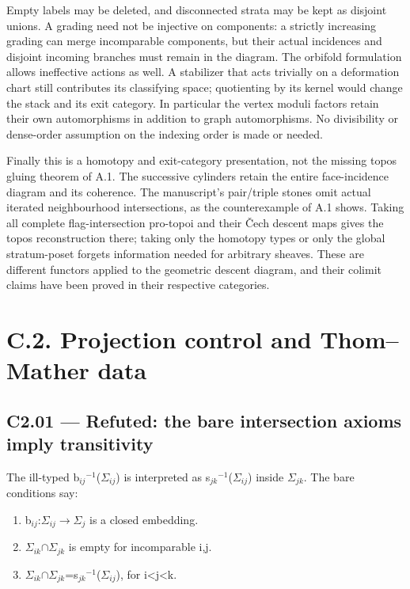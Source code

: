 Empty labels may be deleted, and disconnected strata may be kept as disjoint unions. A grading need not be injective on components: a strictly increasing grading can merge incomparable components, but their actual incidences and disjoint incoming branches must remain in the diagram. The orbifold formulation allows ineffective actions as well. A stabilizer that acts trivially on a deformation chart still contributes its classifying space; quotienting by its kernel would change the stack and its exit category. In particular the vertex moduli factors retain their own automorphisms in addition to graph automorphisms. No divisibility or dense-order assumption on the indexing order is made or needed.

Finally this is a homotopy and exit-category presentation, not the missing topos gluing theorem of A.1. The successive cylinders retain the entire face-incidence diagram and its coherence. The manuscript's pair/triple stones omit actual iterated neighbourhood intersections, as the counterexample of A.1 shows. Taking all complete flag-intersection pro-topoi and their \v{C}ech descent maps gives the topos reconstruction there; taking only the homotopy types or only the global stratum-poset forgets information needed for arbitrary sheaves. These are different functors applied to the geometric descent diagram, and their colimit claims have been proved in their respective categories.

\section{C.2. Projection control and Thom--Mather data}\label{c.2.-projection-control-and-thommather-data}

\subsection{C2.01 --- Refuted: the bare intersection axioms imply transitivity}\label{c2.01-refuted-the-bare-intersection-axioms-imply-transitivity}

The ill-typed b\ensuremath{{}_{ij}}\ensuremath{{}^{-1}}(\ensuremath{\Sigma}\ensuremath{{}_{ij}}) is interpreted as s\ensuremath{{}_{jk}}\ensuremath{{}^{-1}}(\ensuremath{\Sigma}\ensuremath{{}_{ij}}) inside \ensuremath{\Sigma}\ensuremath{{}_{jk}}. The bare conditions say:

\begin{enumerate}
\def\labelenumi{\arabic{enumi}.}
\tightlist
\item
  b\ensuremath{{}_{ij}}:\ensuremath{\Sigma}\ensuremath{{}_{ij}}\ensuremath{\to}\ensuremath{\Sigma}\ensuremath{{}_{j}} is a closed embedding.
\item
  \ensuremath{\Sigma}\ensuremath{{}_{ik}}\ensuremath{\cap}\ensuremath{\Sigma}\ensuremath{{}_{jk}} is empty for incomparable i,j.
\item
  \ensuremath{\Sigma}\ensuremath{{}_{ik}}\ensuremath{\cap}\ensuremath{\Sigma}\ensuremath{{}_{jk}}=s\ensuremath{{}_{jk}}\ensuremath{{}^{-1}}(\ensuremath{\Sigma}\ensuremath{{}_{ij}}), for i\textless j\textless k.
\end{enumerate}

